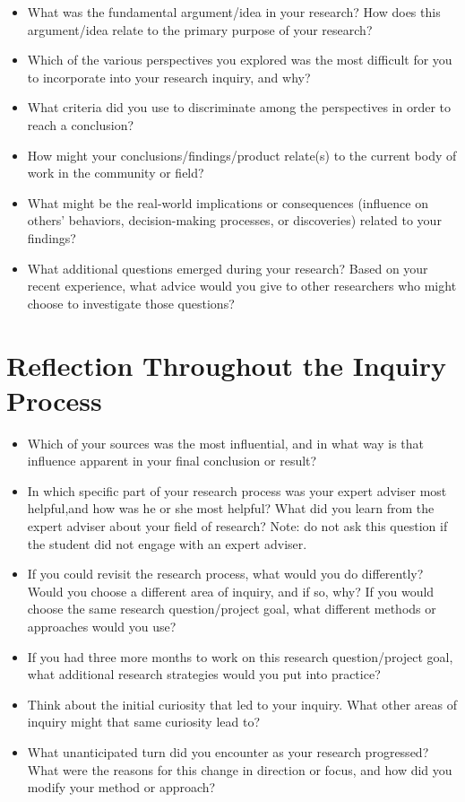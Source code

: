 \documentclass[]{article}
\begin{document}
\begin{itemize}
\item
  What was the fundamental argument/idea in your research? How does this
  argument/idea relate to the primary purpose of your research?
\item
  Which of the various perspectives you explored was the most difficult
  for you to incorporate into your research inquiry, and why?
\item
  What criteria did you use to discriminate among the perspectives in
  order to reach a conclusion?
\item
  How might your conclusions/findings/product relate(s) to the current
  body of work in the community or field?
\item
  What might be the real-world implications or consequences (influence
  on others' behaviors, decision-making processes, or discoveries)
  related to your findings?
\item
  What additional questions emerged during your research? Based on your
  recent experience, what advice would you give to other researchers who
  might choose to investigate those questions?
\end{itemize}

\hypertarget{reflection-throughout-the-inquiry-process}{%
\section{Reflection Throughout the Inquiry
Process}\label{reflection-throughout-the-inquiry-process}}

\begin{itemize}
\item
  Which of your sources was the most influential, and in what way is
  that influence apparent in your final conclusion or result?
\item
  In which specific part of your research process was your expert
  adviser most helpful,and how was he or she most helpful? What did you
  learn from the expert adviser about your field of research? Note: do
  not ask this question if the student did not engage with an expert
  adviser.
\item
  If you could revisit the research process, what would you do
  differently? Would you choose a different area of inquiry, and if so,
  why? If you would choose the same research question/project goal, what
  different methods or approaches would you use?
\item
  If you had three more months to work on this research question/project
  goal, what additional research strategies would you put into practice?
\item
  Think about the initial curiosity that led to your inquiry. What other
  areas of inquiry might that same curiosity lead to?
\item
  What unanticipated turn did you encounter as your research progressed?
  What were the reasons for this change in direction or focus, and how
  did you modify your method or approach?
\end{itemize}
\end{document}
